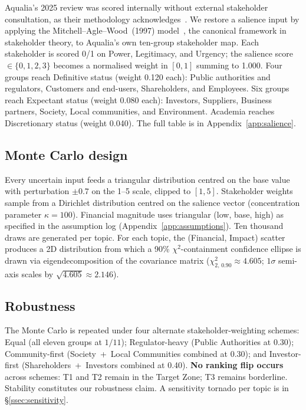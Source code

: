 \documentclass[11pt, a4paper]{article}
\newcommand{\sig}[1]{\textbf{#1}}
\begin{document}
Aqualia's 2025 review was scored internally without external stakeholder consultation, as their methodology acknowledges~\cite{aqualiaMethodology2025}. We restore a salience input by applying the Mitchell--Agle--Wood~(1997) model~\cite{mitchell1997}, the canonical framework in stakeholder theory, to Aqualia's own ten-group stakeholder map. Each stakeholder is scored 0/1 on Power, Legitimacy, and Urgency; the salience score $\in \{0,1,2,3\}$ becomes a normalised weight in $[0,1]$ summing to 1.000. Four groups reach Definitive status (weight 0.120 each): Public authorities and regulators, Customers and end-users, Shareholders, and Employees. Six groups reach Expectant status (weight 0.080 each): Investors, Suppliers, Business partners, Society, Local communities, and Environment. Academia reaches Discretionary status (weight 0.040). The full table is in Appendix~\ref{app:salience}.

\subsection{Monte Carlo design}
\label{ssec:mc}

Every uncertain input feeds a triangular distribution centred on the base value with perturbation $\pm 0.7$ on the 1--5 scale, clipped to $[1,5]$. Stakeholder weights sample from a Dirichlet distribution centred on the salience vector (concentration parameter $\kappa = 100$). Financial magnitude uses triangular (low, base, high) as specified in the assumption log (Appendix~\ref{app:assumptions}). Ten thousand draws are generated per topic. For each topic, the (Financial, Impact) scatter produces a 2D distribution from which a 90\% $\chi^2$-containment confidence ellipse is drawn via eigendecomposition of the covariance matrix ($\chi^2_{2,\,0.90} \approx 4.605$; $1\sigma$ semi-axis scales by $\sqrt{4.605} \approx 2.146$).

\subsection{Robustness}

The Monte Carlo is repeated under four alternate stakeholder-weighting schemes: Equal (all eleven groups at $1/11$); Regulator-heavy (Public Authorities at 0.30); Community-first (Society~+~Local Communities combined at 0.30); and Investor-first (Shareholders~+~Investors combined at 0.40). \sig{No ranking flip occurs} across schemes: T1 and T2 remain in the Target Zone; T3 remains borderline. Stability constitutes our robustness claim. A sensitivity tornado per topic is in \S\ref{ssec:sensitivity}.
\end{document}
